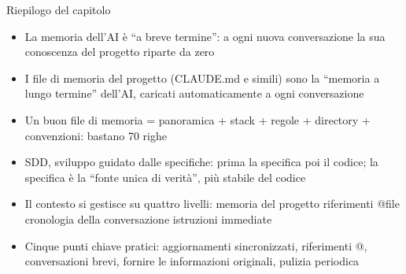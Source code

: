 \begin{tcbsummary}{Riepilogo del capitolo}
\begin{itemize}
  \item La memoria dell'AI è “a breve termine”: a ogni nuova conversazione la sua conoscenza del progetto riparte da zero
  \item I file di memoria del progetto (CLAUDE.md e simili) sono la “memoria a lungo termine” dell'AI, caricati automaticamente a ogni conversazione
  \item Un buon file di memoria = panoramica + stack + regole + directory + convenzioni: bastano 70 righe
  \item SDD, sviluppo guidato dalle specifiche: prima la specifica poi il codice; la specifica è la “fonte unica di verità”, più stabile del codice
  \item Il contesto si gestisce su quattro livelli: memoria del progetto riferimenti @file cronologia della conversazione istruzioni immediate
  \item Cinque punti chiave pratici: aggiornamenti sincronizzati, riferimenti @, conversazioni brevi, fornire le informazioni originali, pulizia periodica
\end{itemize}

\end{tcbsummary}
